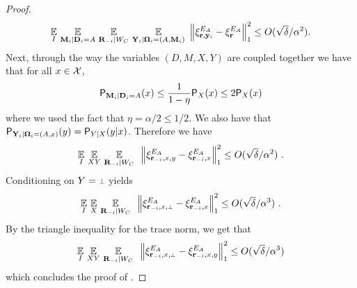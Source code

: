 \begin{proof}
\[
	\operatorname*{\mathbb{E}}_I \, \operatorname*{\mathbb{E}}_{\mathbf{M}_i | \mathbf{D}_i =A} \, \operatorname*{\mathbb{E}}_{\mathbf{R}_{-i} | W_C} \, \operatorname*{\mathbb{E}}_{\mathbf{Y}_i | {\boldsymbol{\Omega}}_i=(A,\mathbf{M}_i)} \,\, \Big \| \xi^{E_A}_{\mathbf{r},\mathbf{y}_i} -  \xi^{E_A}_{\mathbf{r}} \Big \|_1^2 \leq O(\sqrt{\delta}/\alpha^2).
\]
Next, through the way the variables $(D,M,X,Y)$ are coupled together we have that for all $x \in \mathcal{X}$,
\[
	\mathsf{P}_{\mathbf{M}_i | \mathbf{D}_i = A}(x) \leq \frac{1}{1 - \eta} \mathsf{P}_X(x) \leq 2 \mathsf{P}_X(x)
\]
where we used the fact that $\eta = \alpha/2 \leq 1/2$. We also have that $\mathsf{P}_{\mathbf{Y}_i | {\boldsymbol{\Omega}}_i = (A,x)}(y) = \mathsf{P}_{Y | X}(y|x)$. Therefore we have
\[
	\operatorname*{\mathbb{E}}_I \, \operatorname*{\mathbb{E}}_{XY} \, \operatorname*{\mathbb{E}}_{\mathbf{R}_{-i} | W_C} \, \,\, \Big \| \xi^{E_A}_{\mathbf{r}_{-i},x,y} -  \xi^{E_A}_{\mathbf{r}_{-i},x} \Big \|_1^2 \leq O(\sqrt{\delta}/\alpha^2)~.
\]
Conditioning on $Y = \dummy$ yields
\[
	\Ex_I \, \Ex_{X} \, \Ex_{\bR_\mi | W_C} \, \,\, \Big \| \xi^{E_A}_{\br_\mi,x,\dummy} -  \xi^{E_A}_{\br_\mi,x} \Big \|_1^2 \leq O(\sqrt{\delta}/\alpha^3)~.
\]
By the triangle inequality for the trace norm, we get that
\[
\Ex_I \, \Ex_{XY} \, \Ex_{\bR_\mi | W_C} \, \,\, \Big \| \xi^{E_A}_{\br_\mi,x,\dummy} -  \xi^{E_A}_{\br_\mi,x,y} \Big \|_1^2 \leq O(\sqrt{\delta}/\alpha^3)
\]
which concludes the proof of .
%
\end{proof}

